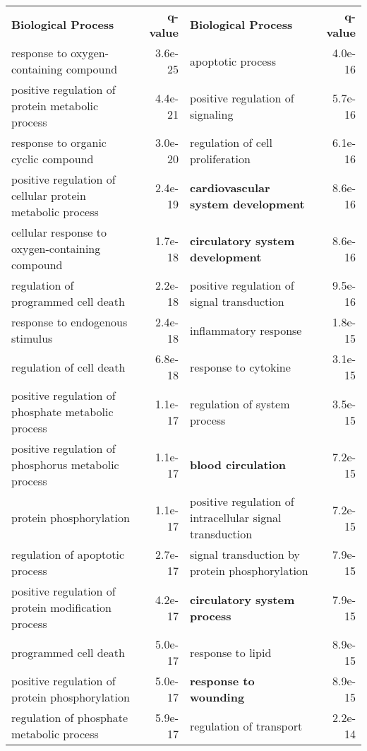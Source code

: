 \documentclass[fleqn,10pt]{SelfArx} %
\begin{document}
\begin{table}[!ht]
	\centering
	\scriptsize
	\begin{tabularx}{\textwidth}{lRlR}
		\textbf{\color{white} Biological Process} & \textbf{\color{white} q-value} & \textbf{\color{white} Biological Process} & \textbf{\color{white} q-value}\\
		response to oxygen-containing compound & 3.6e-25 & apoptotic process & 4.0e-16 \\ 
		positive regulation of protein metabolic process & 4.4e-21 & positive regulation of signaling & 5.7e-16 \\ 
		response to organic cyclic compound & 3.0e-20 & regulation of cell proliferation & 6.1e-16 \\ 
		positive regulation of cellular protein metabolic process & 2.4e-19 & \textbf{cardiovascular system development} & 8.6e-16 \\ 
		cellular response to oxygen-containing compound & 1.7e-18 & \textbf{circulatory system development} & 8.6e-16 \\ 
		regulation of programmed cell death & 2.2e-18 & positive regulation of signal transduction & 9.5e-16 \\ 
		response to endogenous stimulus & 2.4e-18 & inflammatory response & 1.8e-15 \\ 
		regulation of cell death & 6.8e-18 & response to cytokine & 3.1e-15 \\ 
		positive regulation of phosphate metabolic process & 1.1e-17 & regulation of system process & 3.5e-15 \\ 
		positive regulation of phosphorus metabolic process & 1.1e-17 & \textbf{blood circulation} & 7.2e-15 \\ 
		protein phosphorylation & 1.1e-17 & positive regulation of intracellular signal transduction & 7.2e-15 \\ 
		regulation of apoptotic process & 2.7e-17 & signal transduction by protein phosphorylation & 7.9e-15 \\ 
		positive regulation of protein modification process & 4.2e-17 & \textbf{circulatory system process} & 7.9e-15 \\ 
		programmed cell death & 5.0e-17 & response to lipid & 8.9e-15 \\ 
		positive regulation of protein phosphorylation & 5.0e-17 & \textbf{response to wounding} & 8.9e-15 \\ 
		regulation of phosphate metabolic process & 5.9e-17 & regulation of transport & 2.2e-14 \\ 

\end{tabularx}
\end{table}
\end{document}
